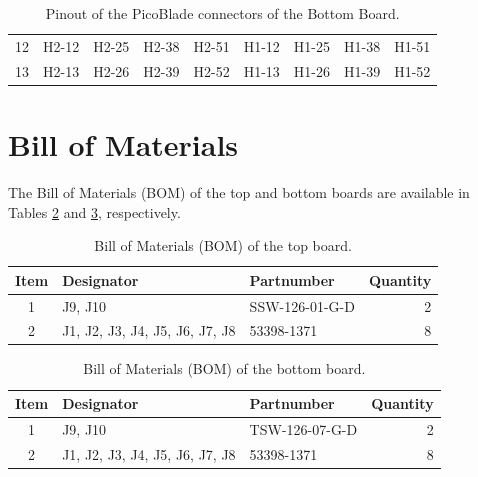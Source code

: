 \begin{table}[!h]
\begin{tabular}{crrrrrrrr}
        12                     & H2-12       & H2-25       & H2-38       & H2-51       & H1-12       & H1-25       & H1-38       & H1-51       \\
        13                     & H2-13       & H2-26       & H2-39       & H2-52       & H1-13       & H1-26       & H1-39       & H1-52       \\
        \bottomrule[1.5pt]
    \end{tabular}
    \caption{Pinout of the PicoBlade connectors of the Bottom Board.}
    \label{tab:pinout-bottom-board}
\end{table}

\section{Bill of Materials}

The Bill of Materials (BOM) of the top and bottom boards are available in Tables \ref{tab:bom-top-board} and \ref{tab:bom-bottom-board}, respectively.

\begin{table}[!h]
    \centering
    \begin{tabular}{cllr}
        \toprule[1.5pt]
        \textbf{Item}   & \textbf{Designator}            & \textbf{Partnumber} & \textbf{Quantity} \\
        \midrule
        1               & J9, J10                        & SSW-126-01-G-D      & 2                 \\
        2               & J1, J2, J3, J4, J5, J6, J7, J8 & 53398-1371          & 8                 \\
        \bottomrule[1.5pt]
    \end{tabular}
    \caption{Bill of Materials (BOM) of the top board.}
    \label{tab:bom-top-board}
\end{table}

\begin{table}[!h]
    \centering
    \begin{tabular}{cllr}
        \toprule[1.5pt]
        \textbf{Item}   & \textbf{Designator}            & \textbf{Partnumber} & \textbf{Quantity} \\
        \midrule
        1               & J9, J10                        & TSW-126-07-G-D      & 2                 \\
        2               & J1, J2, J3, J4, J5, J6, J7, J8 & 53398-1371          & 8                 \\
        \bottomrule[1.5pt]
    \end{tabular}
    \caption{Bill of Materials (BOM) of the bottom board.}
    \label{tab:bom-bottom-board}
\end{table}

